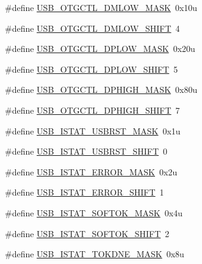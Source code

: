 \begin{DoxyCompactItemize}
\item 
\#define \hyperlink{group___u_s_b___register___masks_ga929467feea7b1506c205dd78112a8a98}{U\+S\+B\+\_\+\+O\+T\+G\+C\+T\+L\+\_\+\+D\+M\+L\+O\+W\+\_\+\+M\+A\+SK}~0x10u
\item 
\#define \hyperlink{group___u_s_b___register___masks_ga11854093d47631b4f11f0c50bf7a063f}{U\+S\+B\+\_\+\+O\+T\+G\+C\+T\+L\+\_\+\+D\+M\+L\+O\+W\+\_\+\+S\+H\+I\+FT}~4
\item 
\#define \hyperlink{group___u_s_b___register___masks_gad6a988a0338aa5fcd511f9644b2375eb}{U\+S\+B\+\_\+\+O\+T\+G\+C\+T\+L\+\_\+\+D\+P\+L\+O\+W\+\_\+\+M\+A\+SK}~0x20u
\item 
\#define \hyperlink{group___u_s_b___register___masks_ga94318731712f5399af57fefe46ac8cec}{U\+S\+B\+\_\+\+O\+T\+G\+C\+T\+L\+\_\+\+D\+P\+L\+O\+W\+\_\+\+S\+H\+I\+FT}~5
\item 
\#define \hyperlink{group___u_s_b___register___masks_ga58ba9522df4e9a18c7efa0472837c30c}{U\+S\+B\+\_\+\+O\+T\+G\+C\+T\+L\+\_\+\+D\+P\+H\+I\+G\+H\+\_\+\+M\+A\+SK}~0x80u
\item 
\#define \hyperlink{group___u_s_b___register___masks_ga898efaea515cbbb64826b7685082665f}{U\+S\+B\+\_\+\+O\+T\+G\+C\+T\+L\+\_\+\+D\+P\+H\+I\+G\+H\+\_\+\+S\+H\+I\+FT}~7
\item 
\#define \hyperlink{group___u_s_b___register___masks_gaacafc35a1c208555b284f9f086708686}{U\+S\+B\+\_\+\+I\+S\+T\+A\+T\+\_\+\+U\+S\+B\+R\+S\+T\+\_\+\+M\+A\+SK}~0x1u
\item 
\#define \hyperlink{group___u_s_b___register___masks_gad463e743b6bdd9589a499bf654703da0}{U\+S\+B\+\_\+\+I\+S\+T\+A\+T\+\_\+\+U\+S\+B\+R\+S\+T\+\_\+\+S\+H\+I\+FT}~0
\item 
\#define \hyperlink{group___u_s_b___register___masks_gaef490eac989ee78a88372bcbf3b029c6}{U\+S\+B\+\_\+\+I\+S\+T\+A\+T\+\_\+\+E\+R\+R\+O\+R\+\_\+\+M\+A\+SK}~0x2u
\item 
\#define \hyperlink{group___u_s_b___register___masks_gaa4afff6c8a78b6b44f3e314dd4746892}{U\+S\+B\+\_\+\+I\+S\+T\+A\+T\+\_\+\+E\+R\+R\+O\+R\+\_\+\+S\+H\+I\+FT}~1
\item 
\#define \hyperlink{group___u_s_b___register___masks_gab45774502290aab38038a19110e8558b}{U\+S\+B\+\_\+\+I\+S\+T\+A\+T\+\_\+\+S\+O\+F\+T\+O\+K\+\_\+\+M\+A\+SK}~0x4u
\item 
\#define \hyperlink{group___u_s_b___register___masks_gae58407103a8cebfc9c4a8e8c7f08fddb}{U\+S\+B\+\_\+\+I\+S\+T\+A\+T\+\_\+\+S\+O\+F\+T\+O\+K\+\_\+\+S\+H\+I\+FT}~2
\item 
\#define \hyperlink{group___u_s_b___register___masks_ga12db7650592f7e48ae702b71d1728c98}{U\+S\+B\+\_\+\+I\+S\+T\+A\+T\+\_\+\+T\+O\+K\+D\+N\+E\+\_\+\+M\+A\+SK}~0x8u

\end{DoxyCompactItemize}
